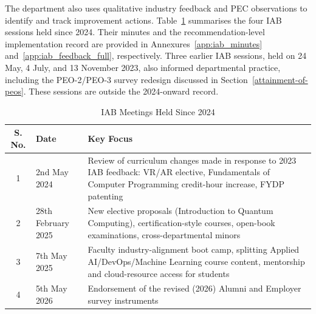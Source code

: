 The department also uses qualitative industry feedback and PEC observations to identify and track improvement actions. Table~\ref{tab:iab_meetings} summarises the four IAB sessions held since 2024. Their minutes and the recommendation-level implementation record are provided in Annexures~\ref{app:iab_minutes} and~\ref{app:iab_feedback_full}, respectively. Three earlier IAB sessions, held on 24 May, 4 July, and 13 November 2023, also informed departmental practice, including the PEO-2/PEO-3 survey redesign discussed in Section~\ref{attainment-of-peos}. These sessions are outside the 2024-onward record. 

\begin{table}[htbp] 
\centering 
\caption{IAB Meetings Held Since 2024} 

\begin{tabular}{|c|l|p{}|} \hline \textbf{S. No.} & \textbf{Date} & \textbf{Key Focus} \\ 
\hline 
1 & 2nd May 2024 & Review of curriculum changes made in response to 2023 IAB feedback: VR/AR elective, Fundamentals of Computer Programming credit-hour increase, FYDP patenting \\ 
\hline 
2 & 28th February 2025 & New elective proposals (Introduction to Quantum Computing), certification-style courses, open-book examinations, cross-departmental minors \\ \hline 
3 & 7th May 2025 & Faculty industry-alignment boot camp, splitting Applied AI/DevOps/Machine Learning course content, mentorship and cloud-resource access for students \\ 
\hline 
4 & 5th May 2026 & Endorsement of the revised (2026) Alumni and Employer survey instruments \\ 
\hline 
\end{tabular} 
\label{tab:iab_meetings} 
\end{table} 

